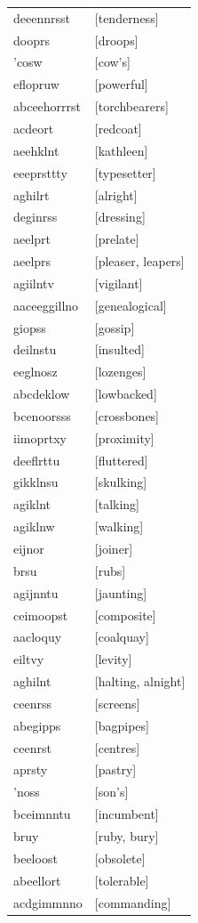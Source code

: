 \documentclass{article}
\begin{document}
\begin{tabular}{ll}
deeennrsst & [tenderness] \\
dooprs & [droops] \\
'cosw & [cow's] \\
eflopruw & [powerful] \\
abceehorrrst & [torchbearers] \\
acdeort & [redcoat] \\
aeehklnt & [kathleen] \\
eeeprsttty & [typesetter] \\
aghilrt & [alright] \\
deginrss & [dressing] \\
aeelprt & [prelate] \\
aeelprs & [pleaser, leapers] \\
agiilntv & [vigilant] \\
aaceeggillno & [genealogical] \\
giopss & [gossip] \\
deilnstu & [insulted] \\
eeglnosz & [lozenges] \\
abcdeklow & [lowbacked] \\
bcenoorsss & [crossbones] \\
iimoprtxy & [proximity] \\
deeflrttu & [fluttered] \\
gikklnsu & [skulking] \\
agiklnt & [talking] \\
agiklnw & [walking] \\
eijnor & [joiner] \\
brsu & [rubs] \\
agijnntu & [jaunting] \\
ceimoopst & [composite] \\
aacloquy & [coalquay] \\
eiltvy & [levity] \\
aghilnt & [halting, alnight] \\
ceenrss & [screens] \\
abegipps & [bagpipes] \\
ceenrst & [centres] \\
aprsty & [pastry] \\
'noss & [son's] \\
bceimnntu & [incumbent] \\
bruy & [ruby, bury] \\
beeloost & [obsolete] \\
abeellort & [tolerable] \\
acdgimmnno & [commanding] \\

\end{tabular}
\end{document}
